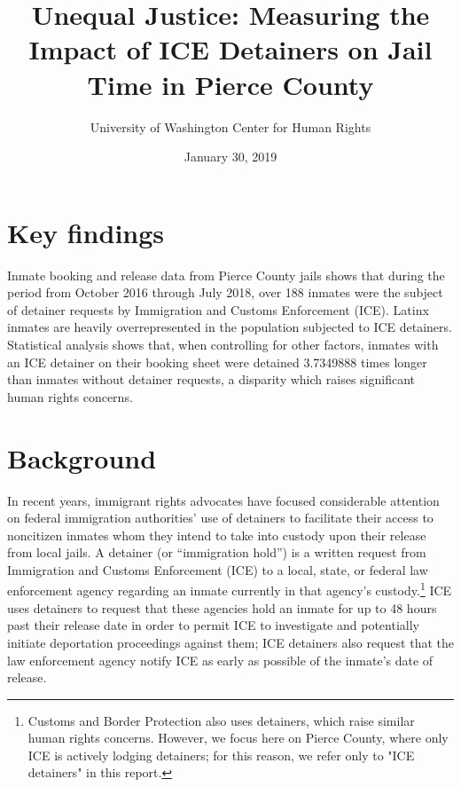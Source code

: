 \documentclass[12pt]{report}\usepackage[]{graphicx}\usepackage[]{color}
\title{Unequal Justice: Measuring the Impact of ICE Detainers on Jail Time in Pierce County}
\author{University of Washington Center for Human Rights}
\date{January 30, 2019}
\DeclareRobustCommand{\subtitle}[1]{\\#1}
\begin{document}
\maketitle

\renewcommand{\subtitle}[1]{}





\section*{Key findings}

Inmate booking and release data from Pierce County jails shows that during the period from October 2016 through July 2018, over 188 inmates were the subject of detainer requests by Immigration and Customs Enforcement (ICE). Latinx inmates are heavily overrepresented in the population subjected to ICE detainers. Statistical analysis shows that, when controlling for other factors, inmates with an ICE detainer on their booking sheet were detained \num[round-precision=1]{3.7349888} times longer than inmates without detainer requests, a disparity which raises significant human rights concerns.

\section*{Background}

In recent years, immigrant rights advocates have focused considerable attention on federal immigration authorities' use of detainers to facilitate their access to noncitizen inmates whom they intend to take into custody upon their release from local jails. A detainer (or ``immigration hold'') is a written request from Immigration and Customs Enforcement (ICE) to a local, state, or federal law enforcement agency regarding an inmate currently in that agency's custody.\footnote{Customs and Border Protection also uses detainers, which raise similar human rights concerns. However, we focus here on Pierce County, where only ICE is actively lodging detainers; for this reason, we refer only to "ICE detainers" in this report.} ICE uses detainers to request that these agencies hold an inmate for up to 48 hours past their release date in order to permit ICE to investigate and potentially initiate deportation proceedings against them; ICE detainers also request that the law enforcement agency notify ICE as early as possible of the inmate's date of release.
\end{document}
